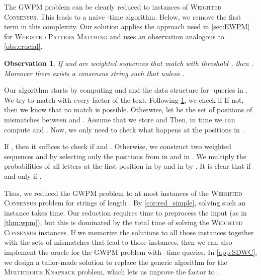 \documentclass{article}
\theoremstyle{plain}
\newtheorem{observation}[theorem]{Observation}
\theoremstyle{definition}
\newcommand{\MK}{\textsc{Multichoice Knapsack}\xspace}
\newcommand{\WPM}{\textsc{Weighted Pattern Matching}\xspace}
\newcommand{\GWPM}{\textsc{GWPM}\xspace}
\newcommand{\WC}{\textsc{Weighted Consensus}\xspace}
\begin{document}
    The \GWPM problem can be clearly reduced to  instances of \WC. 
    This leads to a naive -time algorithm.
    Below, we remove the first term in this complexity. 
    Our solution applies the approach used in \cref{sec:EWPM} for \WPM and uses an observation
    analogous to \cref{obs:crucial}.
    
    \begin{observation}\label{obs:crucial2}
      If  and  are weighted sequences that match with threshold ,
      then .
      Moreover there exists a consensus string  such that  unless .
    \end{observation}
 
    Our algorithm starts by computing  and  and the data structure for -queries in .
    We try to match  with every factor  of the text.
    Following \cref{obs:crucial2}, we check if 
    If not, then we know that no match is possible.
    Otherwise, let  be the set of positions of mismatches between  and .
    Assume that we store
     and 
    Then, in  time we can compute  and
    .
Now, we only need to check what happens at the positions in .

    If , then it suffices to check if  and .
    Otherwise, we construct two weighted sequences  and  by selecting only the positions from  in  and in .
    We multiply the probabilities of all letters at the first position in  by  and in  by .
    It is clear that  if and only if .
    
    Thus, we reduced the \GWPM problem to at most  instances of the \WC problem for strings of length . 
    By \cref{cor:red_simple}, solving such an instance takes  time.   
    Our reduction requires  time to preprocess the input (as in \cref{thm:wpm}),
    but this is dominated by the  total time of solving the \WC instances.
    If we memorize the solutions to all those instances
    together with the sets of mismatches  that lead to those instances, then we can also implement the oracle for the \GWPM problem with -time queries.
     In \cref{app:SDWC}, we design a tailor-made solution to replace the generic algorithm for the \MK problem,
     which lets us improve the  factor to . 
        
\end{document}
